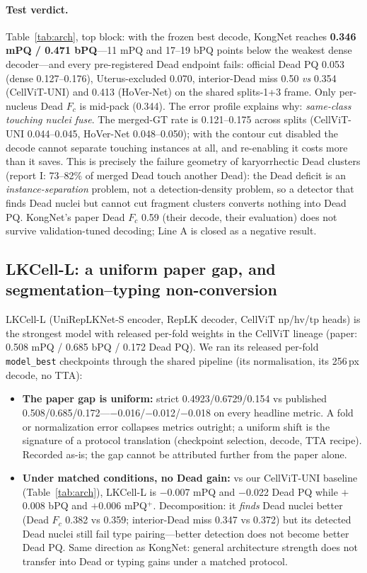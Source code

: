\documentclass[11pt]{article}
\begin{document}
\paragraph{Test verdict.} Table~\ref{tab:arch}, top block: with the frozen best decode,
KongNet reaches \textbf{0.346 mPQ / 0.471 bPQ}---11 mPQ and 17--19 bPQ points below the
weakest dense decoder---and every pre-registered Dead endpoint fails: official Dead PQ 0.053
(dense
0.127--0.176), Uterus-excluded 0.070, interior-Dead miss 0.50 \emph{vs} 0.354 (CellViT-UNI)
and 0.413 (HoVer-Net) on the shared splits-1+3 frame. Only per-nucleus Dead $F_c$ is
mid-pack (0.344). The error profile explains why: \emph{same-class touching nuclei fuse}.
The merged-GT rate is 0.121--0.175 across splits (CellViT-UNI 0.044--0.045, HoVer-Net
0.048--0.050); with the contour cut disabled the decode cannot separate touching instances at
all, and re-enabling it costs more than it saves. This is precisely the failure geometry of
karyorrhectic Dead clusters (report I: 73--82\% of merged Dead touch another Dead): the Dead
deficit is an \emph{instance-separation} problem, not a detection-density problem, so a
detector that finds Dead nuclei but cannot cut fragment clusters converts nothing into Dead
PQ. KongNet's paper Dead $F_c$ 0.59 (their decode, their evaluation) does not survive
validation-tuned decoding; Line A is closed as a negative result.

\subsection{LKCell-L: a uniform paper gap, and segmentation--typing non-conversion}
\label{sec:lkcell}

LKCell-L (UniRepLKNet-S encoder, RepLK decoder, CellViT np/hv/tp heads) is the strongest
model with released per-fold weights in the CellViT lineage (paper: 0.508 mPQ / 0.685 bPQ /
0.172 Dead PQ). We ran its released per-fold \texttt{model\_best} checkpoints through the
shared pipeline (its normalisation, its 256\,px decode, no TTA):

\begin{itemize}
\item \textbf{The paper gap is uniform:} strict 0.4923/0.6729/0.154 vs published
0.508/0.685/0.172---$-$0.016/$-$0.012/$-$0.018 on every headline metric. A fold or
normalization error collapses metrics outright; a uniform shift is the signature of a
protocol translation (checkpoint selection, decode, TTA recipe). Recorded as-is; the gap
cannot be attributed further from the paper alone.
\item \textbf{Under matched conditions, no Dead gain:} vs our CellViT-UNI baseline
(Table~\ref{tab:arch}), LKCell-L is $-$0.007 mPQ and $-$0.022 Dead PQ while $+$0.008 bPQ and
$+$0.006 mPQ$^+$. Decomposition: it \emph{finds} Dead nuclei better (Dead $F_c$ 0.382 vs
0.359; interior-Dead miss 0.347 vs 0.372) but its detected Dead nuclei still fail type
pairing---better detection does not become better Dead PQ. Same direction as KongNet:
general architecture strength does not transfer into Dead or typing gains under a matched
protocol.
\end{itemize}
\end{document}
